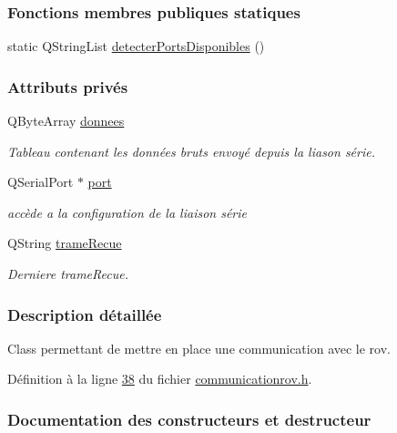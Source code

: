 \subsubsection*{Fonctions membres publiques statiques}
\begin{DoxyCompactItemize}
\item 
static Q\+String\+List \hyperlink{class_communication_rov_ad9882c08083c66cd89b472b9244727e9}{detecter\+Ports\+Disponibles} ()
\end{DoxyCompactItemize}
\subsubsection*{Attributs privés}
\begin{DoxyCompactItemize}
\item 
Q\+Byte\+Array \hyperlink{class_communication_rov_acbb6939bb597179956c6f4bc5ca39f3f}{donnees}
\begin{DoxyCompactList}\small\item\em Tableau contenant les données bruts envoyé depuis la liason série. \end{DoxyCompactList}\item 
Q\+Serial\+Port $\ast$ \hyperlink{class_communication_rov_a21b62067ef0b2a6aec339df60b4abd72}{port}
\begin{DoxyCompactList}\small\item\em accède a la configuration de la liaison série \end{DoxyCompactList}\item 
Q\+String \hyperlink{class_communication_rov_a2f5a49875a9fa51800522c531ecc65fc}{trame\+Recue}
\begin{DoxyCompactList}\small\item\em Derniere trame\+Recue. \end{DoxyCompactList}\end{DoxyCompactItemize}


\subsubsection{Description détaillée}
Class permettant de mettre en place une communication avec le rov. 

Définition à la ligne \hyperlink{communicationrov_8h_source_l00038}{38} du fichier \hyperlink{communicationrov_8h_source}{communicationrov.\+h}.



\subsubsection{Documentation des constructeurs et destructeur}
\mbox{\label{class_communication_rov_a22b64c69228d392a212f543e071adc02}} 

